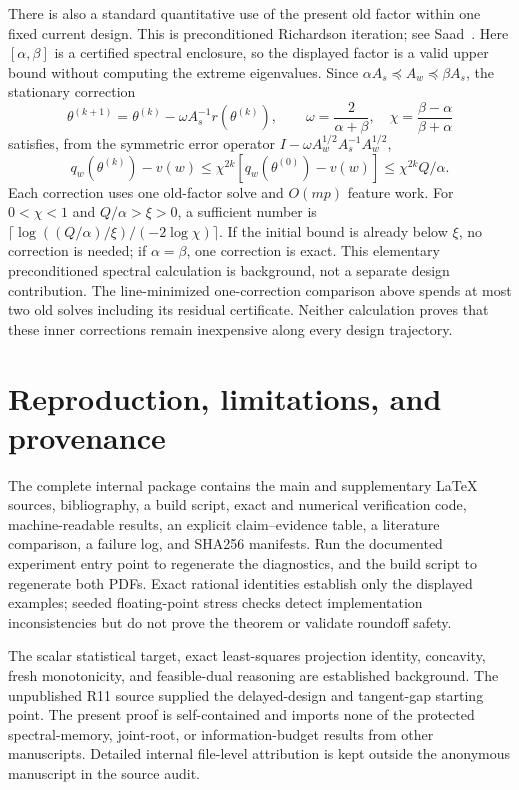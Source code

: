 \documentclass[11pt]{article}
\begin{document}
There is also a standard quantitative use of the present old factor within one fixed current design. This is preconditioned Richardson iteration; see Saad~\cite[Example~4.1, Eq.~(4.33), and Sec.~9.2.1]{saad2003}. Here $[\alpha,\beta]$ is a certified spectral enclosure, so the displayed factor is a valid upper bound without computing the extreme eigenvalues. Since $\alpha A_s\preceq A_w\preceq\beta A_s$, the stationary correction
\[
 \theta^{(k+1)}=\theta^{(k)}-\omega A_s^{-1}r(\theta^{(k)}),\qquad
 \omega=\frac{2}{\alpha+\beta},\quad
 \chi=\frac{\beta-\alpha}{\beta+\alpha}
\]
satisfies, from the symmetric error operator
$I-\omega A_w^{1/2}A_s^{-1}A_w^{1/2}$,
\[
 q_w(\theta^{(k)})-v(w)
 \le\chi^{2k}[q_w(\theta^{(0)})-v(w)]
 \le\chi^{2k}Q/\alpha.
\]
Each correction uses one old-factor solve and $O(mp)$ feature work. For $0<\chi<1$ and $Q/\alpha>\xi>0$, a sufficient number is
$\lceil\log((Q/\alpha)/\xi)/(-2\log\chi)\rceil$.
If the initial bound is already below $\xi$, no correction is needed; if $\alpha=\beta$, one correction is exact. This elementary preconditioned spectral calculation is background, not a separate design contribution. The line-minimized one-correction comparison above spends at most two old solves including its residual certificate. Neither calculation proves that these inner corrections remain inexpensive along every design trajectory.






\section{Reproduction, limitations, and provenance}
The complete internal package contains the main and supplementary \LaTeX{} sources, bibliography, a build script, exact and numerical verification code, machine-readable results, an explicit claim--evidence table, a literature comparison, a failure log, and SHA256 manifests.
Run the documented experiment entry point to regenerate the diagnostics, and the build script to regenerate both PDFs. Exact rational identities establish only the displayed examples; seeded floating-point stress checks detect implementation inconsistencies but do not prove the theorem or validate roundoff safety.

The scalar statistical target, exact least-squares projection identity, concavity, fresh monotonicity, and feasible-dual reasoning are established background. The unpublished R11 source supplied the delayed-design and tangent-gap starting point. The present proof is self-contained and imports none of the protected spectral-memory, joint-root, or information-budget results from other manuscripts. Detailed internal file-level attribution is kept outside the anonymous manuscript in the source audit.
\end{document}
